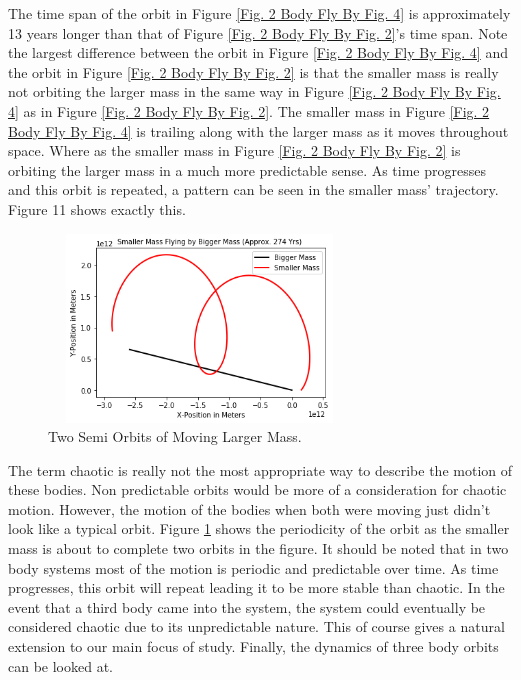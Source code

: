 \documentclass[twocolumn]{article}
\begin{document}
\par \noindent
The time span of the orbit in Figure \ref{Fig. 2 Body Fly By Fig. 4} is approximately 13 years longer than that of Figure \ref{Fig. 2 Body Fly By Fig. 2}'s time span. Note the largest difference between the orbit in Figure \ref{Fig. 2 Body Fly By Fig. 4} and the orbit in Figure \ref{Fig. 2 Body Fly By Fig. 2} is that the smaller mass is really not orbiting the larger mass in the same way in Figure \ref{Fig. 2 Body Fly By Fig. 4} as in Figure \ref{Fig. 2 Body Fly By Fig. 2}. The smaller mass in Figure \ref{Fig. 2 Body Fly By Fig. 4} is trailing along with the larger mass as it moves throughout space. Where as the smaller mass in Figure \ref{Fig. 2 Body Fly By Fig. 2} is orbiting the larger mass in a much more predictable sense. As time progresses and this orbit is repeated, a pattern can be seen in the smaller mass' trajectory. Figure 11 shows exactly this.
\begin{figure}[ht]
    \centering
    \includegraphics[width=8cm, height=5cm]{Figures/2-Body Fly By (5).png}
    \caption{\small{Two Semi Orbits of Moving Larger Mass.}}
    \label{Fig. 2 Body Fly By Fig. 5}
\end{figure}
\par \noindent
The term chaotic is really not the most appropriate way to describe the motion of these bodies. Non predictable orbits would be more of a consideration for chaotic motion. However, the motion of the bodies when both were moving just didn't look like a typical orbit. Figure \ref{Fig. 2 Body Fly By Fig. 5} shows the periodicity of the orbit as the smaller mass is about to complete two orbits in the figure. It should be noted that in two body systems most of the motion is periodic and predictable over time. As time progresses, this orbit will repeat leading it to be more stable than chaotic. In the event that a third body came into the system, the system could eventually be considered chaotic due to its unpredictable nature. This of course gives a natural extension to our main focus of study. Finally, the dynamics of three body orbits can be looked at.
\end{document}
